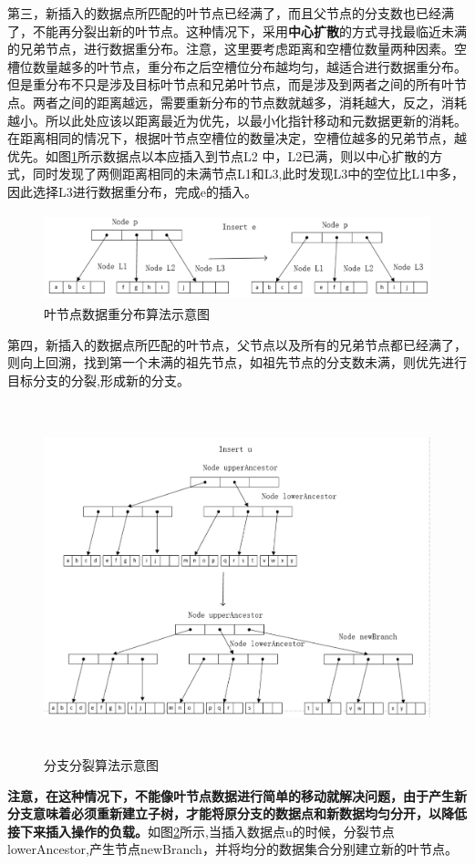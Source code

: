 第三，新插入的数据点所匹配的叶节点已经满了，而且父节点的分支数也已经满了，不能再分裂出新的叶节点。这种情况下，采用\textbf{中心扩散}的方式寻找最临近未满的兄弟节点，进行数据重分布。注意，这里要考虑距离和空槽位数量两种因素。空槽位数量越多的叶节点，重分布之后空槽位分布越均匀，越适合进行数据重分布。但是重分布不只是涉及目标叶节点和兄弟叶节点，而是涉及到两者之间的所有叶节点。两者之间的距离越远，需要重新分布的节点数就越多，消耗越大，反之，消耗越小。所以此处应该以距离最近为优先，以最小化指针移动和元数据更新的消耗。在距离相同的情况下，根据叶节点空槽位的数量决定，空槽位越多的兄弟节点，越优先。如图\ref{insert-show2}所示数据点以本应插入到节点L2 中，L2已满，则以中心扩散的方式，同时发现了两侧距离相同的未满节点L1和L3,此时发现L3中的空位比L1中多，因此选择L3进行数据重分布，完成e的插入。

\begin{figure}[H]
  \centering
  \includegraphics[width=6in,height=1in]{new_FIGs/chapter4/insert-show2.pdf}
  \caption{叶节点数据重分布算法示意图}\label{insert-show2}
\end{figure}

第四，新插入的数据点所匹配的叶节点，父节点以及所有的兄弟节点都已经满了，则向上回溯，找到第一个未满的祖先节点，如祖先节点的分支数未满，则优先进行目标分支的分裂,形成新的分支。
\begin{figure}[H]
  \centering
  \includegraphics[width=6in,height=4in]{new_FIGs/chapter4/insert-show3.pdf}
  \caption{分支分裂算法示意图}\label{insert-show3}
\end{figure}
\textbf{注意，在这种情况下，不能像叶节点数据进行简单的移动就解决问题，由于产生新分支意味着必须重新建立子树，才能将原分支的数据点和新数据均匀分开，以降低接下来插入操作的负载。}如图\ref{insert-show3}所示,当插入数据点u的时候，分裂节点lowerAncestor,产生节点newBranch，并将均分的数据集合分别建立新的叶节点。

